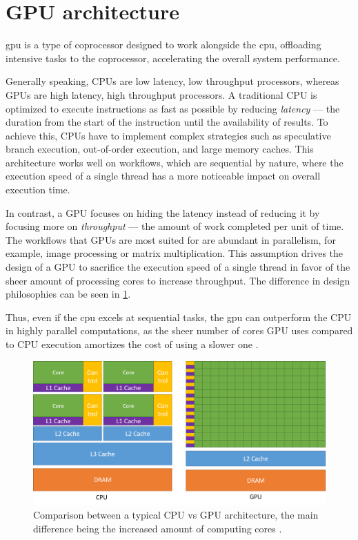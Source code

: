 \section {GPU architecture}

\acrfull{gpu} is a type of coprocessor designed to work alongside the \acrshort{cpu}, offloading intensive tasks to the coprocessor, accelerating the overall system performance.

Generally speaking, CPUs are low latency, low throughput processors, whereas GPUs are high latency, high throughput processors. A traditional CPU is optimized to execute instructions as fast as possible by reducing \textit{latency} --- the duration from the start of the instruction until the availability of results. To achieve this, CPUs have to implement complex strategies such as speculative branch execution, out-of-order execution, and large memory caches. This architecture works well on workflows, which are sequential by nature, where the execution speed of a single thread has a more noticeable impact on overall execution time.

In contrast, a GPU focuses on hiding the latency instead of reducing it by focusing more on \textit{throughput} --- the amount of work completed per unit of time. The workflows that GPUs are most suited for are abundant in parallelism, for example, image processing or matrix multiplication. This assumption drives the design of a GPU to sacrifice the execution speed of a single thread in favor of the sheer amount of processing cores to increase throughput. The difference in design philosophies can be seen in \cref{figure:cpu-vs-gpu}.

Thus, even if the \acrshort{cpu} excels at sequential tasks, the \acrshort{gpu} can outperform the CPU in highly parallel computations, as the sheer number of cores GPU uses compared to CPU execution amortizes the cost of using a slower one \cite{cudaprog}.

\begin{figure}
  \centering
  \includegraphics[width=\textwidth]{components/figure/cpu-vs-gpu.png}
  \caption[Comparison between a typical CPU vs GPU architecture]{Comparison between a typical CPU vs GPU architecture, the main difference being the increased amount of computing cores \cite{cudaprog}.}
  \label{figure:cpu-vs-gpu}
\end{figure}

